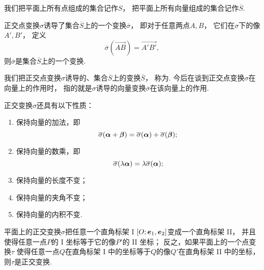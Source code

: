 我们把平面上所有点组成的集合记作\(S\)，
把平面上所有向量组成的集合记作\(\overline{S}\).
\begin{property}
正交点变换\(\sigma\)诱导了集合\(\overline{S}\)上的一个变换\(\overline{\sigma}\)，
即对于任意两点\(A,B\)，
它们在\(\sigma\)下的像\(A',B'\)，
定义\begin{equation*}
	\overline{\sigma}(\vec{AB}) = \vec{A'B'},
\end{equation*}
则\(\overline{\sigma}\)是集合\(\overline{S}\)上的一个变换.
\end{property}

我们把正交点变换\(\sigma\)诱导的、集合\(\overline{S}\)上的变换\(\overline{S}\)，
称为.
今后在谈到正交点变换\(\sigma\)在向量上的作用时，
指的就是\(\sigma\)诱导的向量变换\(\overline{\sigma}\)在该向量上的作用.

\begin{property}
正交变换\(\sigma\)还具有以下性质：\begin{enumerate}
	\item 保持向量的加法，即\begin{equation*}
		\overline{\sigma}(\boldsymbol\alpha+\boldsymbol\beta)
		= \overline{\sigma}(\boldsymbol\alpha)
		+ \overline{\sigma}(\boldsymbol\beta);
	\end{equation*}

	\item 保持向量的数乘，即\begin{equation*}
		\overline{\sigma}(\lambda \boldsymbol\alpha)
		= \lambda \overline{\sigma}(\boldsymbol\alpha);
	\end{equation*}

	\item 保持向量的长度不变；

	\item 保持向量的夹角不变；

	\item 保持向量的内积不变.
\end{enumerate}
\end{property}

\begin{theorem}
平面上的正交变换\(\sigma\)把任意一个直角标架 I \([O;\boldsymbol{e}_1,\boldsymbol{e}_2]\)变成一个直角标架 II，
并且使得任意一点\(P\)的 I 坐标等于它的像\(P'\)的 II 坐标；
反之，如果平面上的一个点变换\(\tau\)
使得任意一点\(Q\)在直角标架 I 中的坐标等于\(Q\)的像\(Q'\)在直角标架 II 中的坐标，
则\(\tau\)是正交变换.
\end{theorem}

